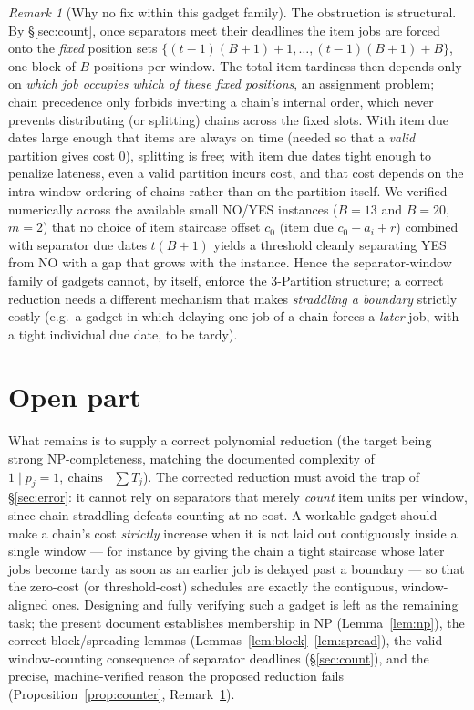 \documentclass{amsart}
\theoremstyle{definition}
\theoremstyle{remark}
\newtheorem{remark}{Remark}
\begin{document}
\begin{remark}[Why no fix within this gadget family]\label{rem:obstruction}
The obstruction is structural. By \S\ref{sec:count}, once separators meet their
deadlines the item jobs are forced onto the \emph{fixed} position sets
$\{(t-1)(B+1)+1,\dots,(t-1)(B+1)+B\}$, one block of $B$ positions per window. The total
item tardiness then depends only on \emph{which job occupies which of these fixed
positions}, an assignment problem; chain precedence only forbids inverting a chain's
internal order, which never prevents distributing (or splitting) chains across the fixed
slots. With item due dates large enough that items are always on time (needed so that a
\emph{valid} partition gives cost $0$), splitting is free; with item due dates tight
enough to penalize lateness, even a valid partition incurs cost, and that cost depends on
the intra-window ordering of chains rather than on the partition itself. We verified
numerically across the available small NO/YES instances ($B=13$ and $B=20$, $m=2$) that
no choice of item staircase offset $c_0$ (item due $c_0-a_i+r$) combined with separator
due dates $t(B+1)$ yields a threshold cleanly separating YES from NO with a gap that
grows with the instance. Hence the separator-window family of gadgets cannot, by itself,
enforce the $3$-Partition structure; a correct reduction needs a different mechanism that
makes \emph{straddling a boundary} strictly costly (e.g.\ a gadget in which delaying one
job of a chain forces a \emph{later} job, with a tight individual due date, to be tardy).
\end{remark}

\section{Open part}

What remains is to supply a correct polynomial reduction (the target being strong
NP-completeness, matching the documented complexity of
$1\mid p_j=1,\ \mathrm{chains}\mid\sum T_j$). The corrected reduction must avoid the trap
of \S\ref{sec:error}: it cannot rely on separators that merely \emph{count} item units
per window, since chain straddling defeats counting at no cost. A workable gadget should
make a chain's cost \emph{strictly} increase when it is not laid out contiguously inside a
single window --- for instance by giving the chain a tight staircase whose later jobs
become tardy as soon as an earlier job is delayed past a boundary --- so that the
zero-cost (or threshold-cost) schedules are exactly the contiguous, window-aligned ones.
Designing and fully verifying such a gadget is left as the remaining task; the present
document establishes membership in NP (Lemma~\ref{lem:np}), the correct block/spreading
lemmas (Lemmas~\ref{lem:block}--\ref{lem:spread}), the valid window-counting consequence
of separator deadlines (\S\ref{sec:count}), and the precise, machine-verified reason the
proposed reduction fails (Proposition~\ref{prop:counter}, Remark~\ref{rem:obstruction}).
\end{document}

